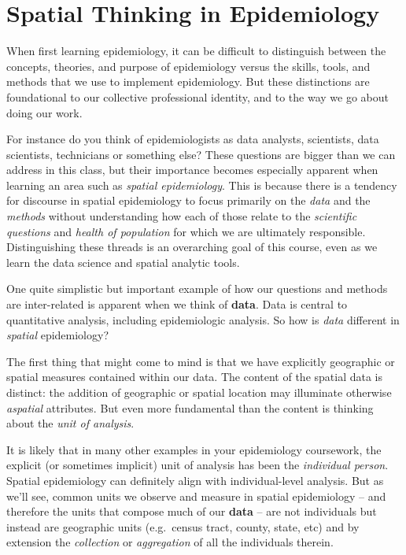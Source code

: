 \documentclass[
]{book}
\begin{document}
\hypertarget{spatial-thinking-in-epidemiology}{%
\section{Spatial Thinking in Epidemiology}\label{spatial-thinking-in-epidemiology}}

When first learning epidemiology, it can be difficult to distinguish between the concepts, theories, and purpose of epidemiology versus the skills, tools, and methods that we use to implement epidemiology. But these distinctions are foundational to our collective professional identity, and to the way we go about doing our work.

For instance do you think of epidemiologists as data analysts, scientists, data scientists, technicians or something else? These questions are bigger than we can address in this class, but their importance becomes especially apparent when learning an area such as \emph{spatial epidemiology}. This is because there is a tendency for discourse in spatial epidemiology to focus primarily on the \emph{data} and the \emph{methods} without understanding how each of those relate to the \emph{scientific questions} and \emph{health of population} for which we are ultimately responsible. Distinguishing these threads is an overarching goal of this course, even as we learn the data science and spatial analytic tools.

One quite simplistic but important example of how our questions and methods are inter-related is apparent when we think of \textbf{data}. Data is central to quantitative analysis, including epidemiologic analysis. So how is \emph{data} different in \emph{spatial} epidemiology?

The first thing that might come to mind is that we have explicitly geographic or spatial measures contained within our data. The content of the spatial data is distinct: the addition of geographic or spatial location may illuminate otherwise \emph{aspatial} attributes. But even more fundamental than the content is thinking about the \emph{unit of analysis}.

It is likely that in many other examples in your epidemiology coursework, the explicit (or sometimes implicit) unit of analysis has been the \emph{individual person}. Spatial epidemiology can definitely align with individual-level analysis. But as we'll see, common units we observe and measure in spatial epidemiology -- and therefore the units that compose much of our \textbf{data} -- are not individuals but instead are geographic units (e.g.~census tract, county, state, etc) and by extension the \emph{collection} or \emph{aggregation} of all the individuals therein.
\end{document}
